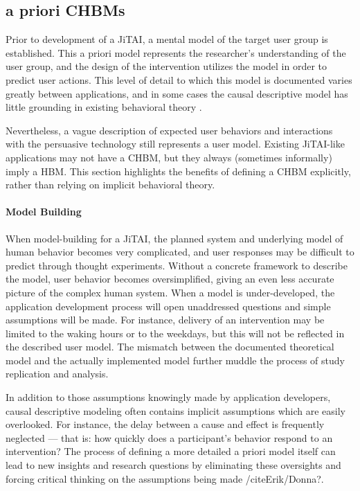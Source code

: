 \documentclass[runningheads,a4paper]{llncs}
\begin{document}
\subsection{a priori CHBMs}
Prior to development of a JiTAI, a mental model of the target user group is established.
This a priori model represents the researcher’s understanding of the user group, and the design of the intervention utilizes the model in order to predict user actions.
This level of detail to which this model is documented varies greatly between applications, and in some cases the causal descriptive model has little grounding in existing behavioral theory \cite{prestwich2014does}.


Nevertheless, a vague description of expected user behaviors and interactions with the persuasive technology still represents a user model.
Existing JiTAI-like applications may not have a CHBM, but they always (sometimes informally) imply a HBM.
This section highlights the benefits of defining a CHBM explicitly, rather than relying on implicit behavioral theory.
\paragraph{Model Building}
When model-building for a JiTAI, the planned system and underlying model of human behavior becomes very complicated, and user responses may be difficult to predict through thought experiments.
Without a concrete framework to describe the model, user behavior becomes oversimplified, giving an even less accurate picture of the complex human system.
When a model is under-developed, the application development process will open unaddressed questions and simple assumptions will be made.
For instance, delivery of an intervention may be limited to the waking hours or to the weekdays, but this will not be reflected in the described user model.
The mismatch between the documented theoretical model and the actually implemented model further muddle the process of study replication and analysis.

In addition to those assumptions knowingly made by application developers, causal descriptive modeling often contains implicit assumptions which are easily overlooked.
For instance, the delay between a cause and effect is frequently neglected --- that is: how quickly does a participant’s behavior respond to an intervention?
The process of defining a more detailed a priori model itself can lead to new insights and research questions by eliminating these oversights and forcing critical thinking on the assumptions being made /cite{Erik/Donna?}.
\end{document}
